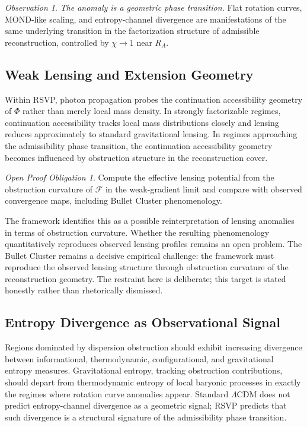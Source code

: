 \documentclass[11pt, a4paper]{article}
\theoremstyle{plain}
\theoremstyle{definition}
\theoremstyle{remark}
\newtheorem{obligation}[theorem]{Open Proof Obligation}
\newtheorem{observation}[theorem]{Observation}
\newcommand{\RA}{R_{\!A}}
\newcommand{\sheaf}{\mathcal{F}}
\begin{document}
\begin{observation}
\label{obs:phase-transition-central}
\emph{The anomaly is a geometric phase transition.} Flat rotation curves, MOND-like
scaling, and entropy-channel divergence are manifestations of the same underlying
transition in the factorization structure of admissible reconstruction, controlled by
$\chi \to 1$ near $\RA$.
\end{observation}

\subsection{Weak Lensing and Extension Geometry}

Within RSVP, photon propagation probes the continuation accessibility geometry of
$\Phi$ rather than merely local mass density. In strongly factorizable regimes,
continuation accessibility tracks local mass distributions closely and lensing
reduces approximately to standard gravitational lensing. In regimes approaching the
admissibility phase transition, the continuation accessibility geometry becomes
influenced by obstruction structure in the reconstruction cover.

\begin{obligation}
\label{obl:lensing}
Compute the effective lensing potential from the obstruction curvature of $\sheaf$
in the weak-gradient limit and compare with observed convergence maps, including
Bullet Cluster phenomenology.
\end{obligation}

The framework identifies this as a possible reinterpretation of lensing anomalies in
terms of obstruction curvature. Whether the resulting phenomenology quantitatively
reproduces observed lensing profiles remains an open problem. The Bullet Cluster
remains a decisive empirical challenge: the framework must reproduce the observed
lensing structure through obstruction curvature of the reconstruction geometry. The
restraint here is deliberate; this target is stated honestly rather than
rhetorically dismissed.

\subsection{Entropy Divergence as Observational Signal}

Regions dominated by dispersion obstruction should exhibit increasing divergence
between informational, thermodynamic, configurational, and gravitational entropy
measures. Gravitational entropy, tracking obstruction contributions, should depart
from thermodynamic entropy of local baryonic processes in exactly the regimes where
rotation curve anomalies appear. Standard $\Lambda$CDM does not predict
entropy-channel divergence as a geometric signal; RSVP predicts that such divergence
is a structural signature of the admissibility phase transition.
\end{document}

